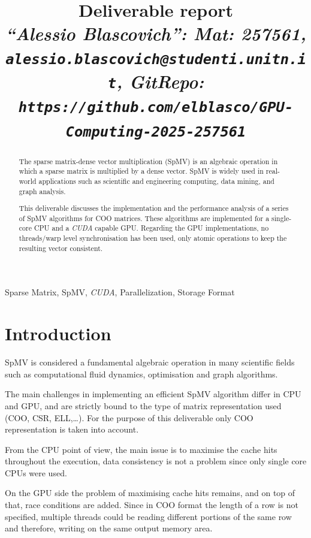 \documentclass[conference]{IEEEtran}
\begin{document}
\title{Deliverable report \\
\footnotesize \textit{``Alessio Blascovich'': Mat: 257561, \texttt{alessio.blascovich@studenti.unitn.it}, GitRepo: \texttt{https://github.com/elblasco/GPU-Computing-2025-257561}}}

\maketitle

\begin{abstract}
The sparse matrix-dense vector multiplication (SpMV) is an algebraic operation in which a sparse matrix is multiplied by a dense vector. SpMV is widely used in real-world applications such as scientific and engineering computing, data mining, and graph analysis.

This deliverable discusses the implementation and the performance analysis of a series of SpMV algorithms for COO matrices. These algorithms are implemented for a single-core CPU and a \emph{CUDA} capable GPU. Regarding the GPU implementations, no threads/warp level synchronisation has been used, only atomic operations to keep the resulting vector consistent.
\end{abstract}

\begin{IEEEkeywords}
Sparse Matrix, SpMV, \emph{CUDA}, Parallelization, Storage Format
\end{IEEEkeywords}

\section{Introduction}
SpMV is considered a fundamental algebraic operation in many scientific fields such as computational fluid dynamics, optimisation and graph algorithms.

The main challenges in implementing an efficient SpMV algorithm differ in CPU and GPU, and are strictly bound to the type of matrix representation used (COO, CSR, ELL,\dots). For the purpose of this deliverable only COO representation is taken into account.

From the CPU point of view, the main issue is to maximise the cache hits throughout the execution, data consistency is not a problem since only single core CPUs were used.

On the GPU side the problem of maximising cache hits remains, and on top of that, race conditions are added. Since in COO format the length of a row is not specified, multiple threads could be reading different portions of the same row and therefore, writing on the same output memory area.
\end{document}

